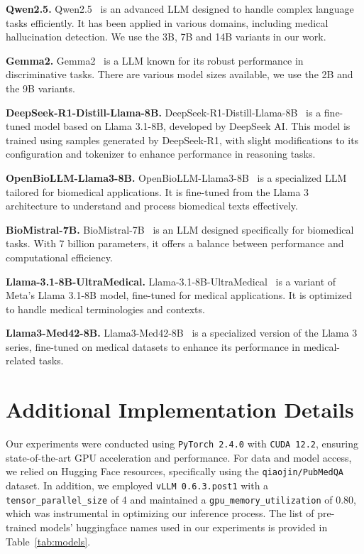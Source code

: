 \noindent \textbf{Qwen2.5.} Qwen2.5~\citep{qwen2025qwen25technicalreport} is an advanced LLM designed to handle complex language tasks efficiently. It has been applied in various domains, including medical hallucination detection. We use the 3B, 7B and 14B variants in our work.


\noindent \textbf{Gemma2.} Gemma2~\citep{gemmateam2024gemma2improvingopen} is a LLM known for its robust performance in discriminative tasks. There are various model sizes available, we use the 2B and the 9B variants.


\noindent \textbf{DeepSeek-R1-Distill-Llama-8B.} DeepSeek-R1-Distill-Llama-8B~\citep{deepseekai2025deepseekr1incentivizingreasoningcapability} is a fine-tuned model based on Llama 3.1-8B, developed by DeepSeek AI. This model is trained using samples generated by DeepSeek-R1, with slight modifications to its configuration and tokenizer to enhance performance in reasoning tasks.

\noindent \textbf{OpenBioLLM-Llama3-8B.} OpenBioLLM-Llama3-8B~\citep{OpenBioLLMs} is a specialized LLM tailored for biomedical applications. It is fine-tuned from the Llama 3 architecture to understand and process biomedical texts effectively.


\noindent \textbf{BioMistral-7B.} BioMistral-7B~\citep{labrak2024biomistral} is an LLM designed specifically for biomedical tasks. With 7 billion parameters, it offers a balance between performance and computational efficiency. 


\noindent \textbf{Llama-3.1-8B-UltraMedical.} Llama-3.1-8B-UltraMedical~\citep{zhang2024ultramedical} is a variant of Meta's Llama 3.1-8B model, fine-tuned for medical applications. It is optimized to handle medical terminologies and contexts.


\noindent \textbf{Llama3-Med42-8B.} Llama3-Med42-8B~\cite{med42v2} is a specialized version of the Llama 3 series, fine-tuned on medical datasets to enhance its performance in medical-related tasks.





\section{Additional Implementation Details}
Our experiments were conducted using \texttt{PyTorch 2.4.0} with \texttt{CUDA 12.2}, ensuring state-of-the-art GPU acceleration and performance. For data and model access, we relied on Hugging Face resources, specifically using the \texttt{qiaojin/PubMedQA} dataset. In addition, we employed \texttt{vLLM 0.6.3.post1} with a \texttt{tensor\_parallel\_size} of 4 and maintained a \texttt{gpu\_memory\_utilization} of 0.80, which was instrumental in optimizing our inference process. The list of pre-trained models' huggingface names used in our experiments is provided in Table~\ref{tab:models}.



